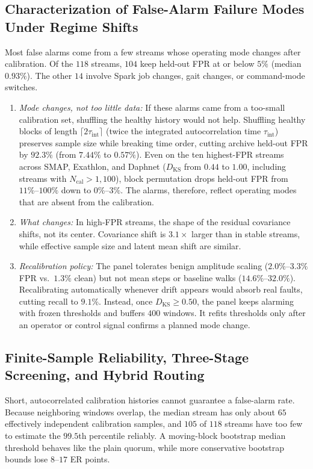 \documentclass[journal]{IEEEtran}
\begin{document}
\subsection{Characterization of False-Alarm Failure Modes Under Regime Shifts}
\label{subsec:regime_shift_modes}
Most false alarms come from a few streams whose operating mode changes after calibration. Of the $118$ streams, $104$ keep held-out FPR at or below $5\%$ (median $0.93\%$). The other $14$ involve Spark job changes, gait changes, or command-mode switches.
\begin{enumerate}[leftmargin=*, nosep, itemsep=1pt]
    \item \emph{Mode changes, not too little data:} If these alarms came from a too-small calibration set, shuffling the healthy history would not help. Shuffling healthy blocks of length $\lceil 2\tau_{\text{int}}\rceil$ (twice the integrated autocorrelation time $\tau_{\text{int}}$) preserves sample size while breaking time order, cutting archive held-out FPR by $92.3\%$ (from $7.44\%$ to $0.57\%$). Even on the ten highest-FPR streams across SMAP, Exathlon, and Daphnet ($D_{\text{KS}}$ from $0.44$ to $1.00$, including streams with $N_{\text{cal}} > 1{,}100$), block permutation drops held-out FPR from $11\%\text{--}100\%$ down to $0\%\text{--}3\%$. The alarms, therefore, reflect operating modes that are absent from the calibration.
    \item \emph{What changes:} In high-FPR streams, the shape of the residual covariance shifts, not its center. Covariance shift is $3.1\times$ larger than in stable streams, while effective sample size and latent mean shift are similar.
    \item \emph{Recalibration policy:} The panel tolerates benign amplitude scaling ($2.0\%\text{--}3.3\%$ FPR vs.\ $1.3\%$ clean) but not mean steps or baseline walks ($14.6\%\text{--}32.0\%$). Recalibrating automatically whenever drift appears would absorb real faults, cutting recall to $9.1\%$. Instead, once $D_{\text{KS}}\ge 0.50$, the panel keeps alarming with frozen thresholds and buffers $400$ windows. It refits thresholds only after an operator or control signal confirms a planned mode change.
\end{enumerate}

\subsection{Finite-Sample Reliability, Three-Stage Screening, and Hybrid Routing}
\label{subsec:finite_sample_calibration}
Short, autocorrelated calibration histories cannot guarantee a false-alarm rate. Because neighboring windows overlap, the median stream has only about $65$ effectively independent calibration samples, and $105$ of $118$ streams have too few to estimate the $99.5$th percentile reliably. A moving-block bootstrap median threshold behaves like the plain quorum, while more conservative bootstrap bounds lose $8\text{--}17$ ER points.
\end{document}
